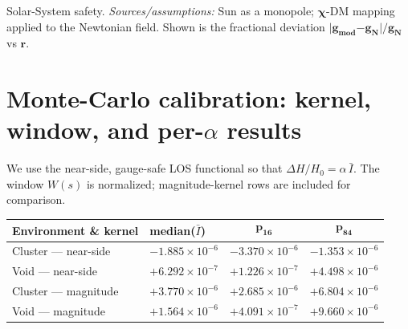 \documentclass[
]{article}
\begin{document}
Solar-System safety. \emph{Sources/assumptions:} Sun as a monopole;
\(\mathbf{\chi}\)-DM mapping applied to the Newtonian field. Shown is
the fractional deviation
\(\mathbf{|}\mathbf{g}_{\mathbf{mod}}\mathbf{-}\mathbf{g}_{\mathbf{N}}\mathbf{|/}\mathbf{g}_{\mathbf{N}}\)
vs \(\mathbf{r}\).

\section{\texorpdfstring{Monte-Carlo calibration: kernel, window, and
per-\(\alpha\)
results}{Monte-Carlo calibration: kernel, window, and per-\textbackslash alpha results}}\label{monte-carlo-calibration-kernel-window-and-per-alpha-results}

We use the near-side, gauge-safe LOS functional so that
\(\Delta H/H_{0} = \alpha\,\bar{I}\). The window \(W(s)\) is normalized;
magnitude-kernel rows are included for comparison.

\begin{longtable}[]{@{}
  >{\raggedright\arraybackslash}p{}
  >{\centering\arraybackslash}p{}
  >{\centering\arraybackslash}p{}
  >{\centering\arraybackslash}p{}@{}}
\toprule\noalign{}
\begin{minipage}[b]{\linewidth}\raggedright
\textbf{Environment \& kernel}
\end{minipage} & \begin{minipage}[b]{\linewidth}\centering
\textbf{median(}\(\bar{I}\)\textbf{)}
\end{minipage} & \begin{minipage}[b]{\linewidth}\centering
\[\mathbf{p}_{\mathbf{16}}\]
\end{minipage} & \begin{minipage}[b]{\linewidth}\centering
\[\mathbf{p}_{\mathbf{84}}\]
\end{minipage} \\
\midrule\noalign{}
\endhead
\bottomrule\noalign{}
\endlastfoot
Cluster --- near-side & \(- 1.885 \times 10^{- 6}\) &
\(- 3.370 \times 10^{- 6}\) & \(- 1.353 \times 10^{- 6}\) \\
Void --- near-side & \(+ 6.292 \times 10^{- 7}\) &
\(+ 1.226 \times 10^{- 7}\) & \(+ 4.498 \times 10^{- 6}\) \\
Cluster --- magnitude & \(+ 3.770 \times 10^{- 6}\) &
\(+ 2.685 \times 10^{- 6}\) & \(+ 6.804 \times 10^{- 6}\) \\
Void --- magnitude & \(+ 1.564 \times 10^{- 6}\) &
\(+ 4.091 \times 10^{- 7}\) & \(+ 9.660 \times 10^{- 6}\) \\
\end{longtable}
\end{document}
